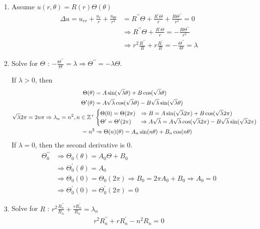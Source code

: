 \begin{enumerate}
  \item Assume $u(r, \theta) = R(r) \Theta(\theta)$
  \begin{align}
    \Delta u = u_{rr} + \frac{u_r}{r} + \frac{u_{\theta\theta}}{r^2} & = R^{\prime\prime} \Theta + \frac{R^\prime \Theta}{r} + \frac{R \Theta^{\prime\prime}}{r^2} = 0\\
    & \Rightarrow R^{\prime\prime} \Theta + \frac{R^\prime \Theta}{r} = - \frac{R\Theta^{\prime\prime}}{r^2}\\
    & \Rightarrow r^2 \frac{R^{\prime\prime}}{R} + r \frac{R^\prime}{R} = - \frac{\Theta^{\prime\prime}}{\Theta} = \lambda
  \end{align}
  \item Solve for $\Theta$ : $- \frac{\Theta^{\prime\prime}}{\Theta} = \lambda \Rightarrow \Theta^{\prime\prime} = -\lambda \Theta$.

  If $\lambda > 0$, then
  \begin{align}
    \Theta(\theta) & =
    A \sin(\sqrt \lambda \theta) + B \cos(\sqrt \lambda \theta)\\
    \Theta^\prime(\theta) & =
    A \sqrt \lambda \cos ( \sqrt \lambda \theta) - B \sqrt \lambda \sin (\sqrt \lambda \theta)\\
    \sqrt \lambda 2 \pi = 2 n \pi \Rightarrow \lambda_n = n^2, n \in \mathbb Z^+ &
    \begin{cases}
      \Theta(0) = \Theta(2\pi) & \Rightarrow
      B = A \sin(\sqrt \lambda 2 \pi) + B \cos(\sqrt \lambda 2 \pi)\\
      \Theta^\prime = \Theta^\prime(2 \pi) & \Rightarrow
      A \sqrt \lambda = A \sqrt \lambda \cos (\sqrt \lambda 2 \pi) - B \sqrt \lambda \sin (\sqrt \lambda 2 \pi)
    \end{cases}\\
    = n^2 & \Rightarrow
    \Theta(n)(\theta) = A_n \sin(n \theta) + B_n \cos(n \theta)
  \end{align}
  If $\lambda = 0$, then the second derivative is $0$.
  \begin{align}
    \Theta^{\prime\prime}_0 & \Rightarrow
    \Theta_0(\theta) = A_0\Theta + B_0\\
    & \Rightarrow \Theta^\prime_0 (\theta) = A_0\\
    & \Rightarrow \Theta_0(0) = \Theta_0(2 \pi) \Rightarrow B_0 = 2 \pi A_0 + B_0 \Rightarrow A_0 = 0\\
    & \Rightarrow \Theta^\prime_0(0) = \Theta^\prime_0 (2 \pi) = 0
  \end{align}
  \item Solve for $R$ : $r^2 \frac{R^{\prime\prime}_n}{R_n} + \frac{rR^\prime_n}{R_n} = \lambda_n$
  \begin{align}
    r^2 R^{\prime\prime}_n + rR^\prime_n - n^2 R_n = 0\\
  \end{align}


\end{enumerate}
